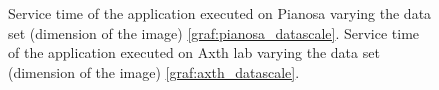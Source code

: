 \begin{figure}[p]
\centering
{}
\caption{ Service time of the application executed on Pianosa varying the data set (dimension of the image)  \ref{graf:pianosa_datascale}.
Service time of the application executed on Axth lab varying the data set (dimension of the image) \ref{graf:axth_datascale}. }
\label{chart:pianosa_axth}
\end{figure}

